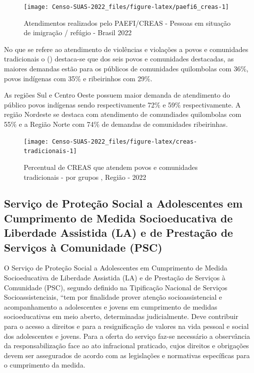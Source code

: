 \documentclass[
  brazilian]{report}
\begin{document}
\begin{figure}
\texttt{[image: Censo-SUAS-2022\_files/figure-latex/paefi6\_creas-1]} \caption[Atendimentos realizados pelo PAEFI/CREAS - Pessoas em situação de imigração / refúgio - Brasil  2022]{Atendimentos realizados pelo PAEFI/CREAS - Pessoas em situação de imigração / refúgio - Brasil  2022}\label{fig:paefi6_creas}
\end{figure}

No que se refere ao atendimento de violências e violações a povos e
comunidades tradicionais o () destaca-se
que dos seis povos e comunidades destacadas, as maiores demandas estão
para os públicos de comunidades quilombolas com 36\%, povos indígenas
com 35\% e ribeirinhos com 29\%.

As regiões Sul e Centro Oeste possuem maior demanda de atendimento do
público povos indígenas sendo respectivamente 72\% e 59\%
respectivamente. A região Nordeste se destaca com atendimento de
comundiades quilombolas com 55\% e a Região Norte com 74\% de demandas
de comunidades ribeirinhas.

\begin{figure}
\texttt{[image: Censo-SUAS-2022\_files/figure-latex/creas-tradicionais-1]} \caption[Percentual de CREAS que atendem povos e comunidades tradicionais -  por grupos , Região - 2022]{Percentual de CREAS que atendem povos e comunidades tradicionais -  por grupos , Região - 2022}\label{fig:creas-tradicionais}
\end{figure}

\hypertarget{serviuxe7o-de-proteuxe7uxe3o-social-a-adolescentes-em-cumprimento-de-medida-socioeducativa-de-liberdade-assistida-la-e-de-prestauxe7uxe3o-de-serviuxe7os-uxe0-comunidade-psc}{%
\subsection{Serviço de Proteção Social a Adolescentes em Cumprimento de
Medida Socioeducativa de Liberdade Assistida (LA) e de Prestação de
Serviços à Comunidade
(PSC)}\label{serviuxe7o-de-proteuxe7uxe3o-social-a-adolescentes-em-cumprimento-de-medida-socioeducativa-de-liberdade-assistida-la-e-de-prestauxe7uxe3o-de-serviuxe7os-uxe0-comunidade-psc}}

O Serviço de Proteção Social a Adolescentes em Cumprimento de Medida
Socioeducativa de Liberdade Assistida (LA) e de Prestação de Serviços à
Comunidade (PSC), segundo definido na Tipificação Nacional de Serviços
Socioassistenciais, ``tem por finalidade prover atenção
socioassistencial e acompanhamento a adolescentes e jovens em
cumprimento de medidas socioeducativas em meio aberto, determinadas
judicialmente. Deve contribuir para o acesso a direitos e para a
resignificação de valores na vida pessoal e social dos adolescentes e
jovens. Para a oferta do serviço faz-se necessário a observância da
responsabilização face ao ato infracional praticado, cujos direitos e
obrigações devem ser assegurados de acordo com as legislações e
normativas específicas para o cumprimento da medida.
\end{document}
